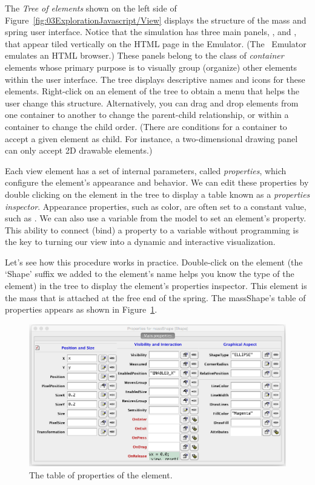 The \emph{Tree of elements} shown on the left side of Figure~\ref{fig:03ExplorationJavascript/View} displays the structure of the
mass and spring user interface. Notice that the simulation has three main panels, ,  and , that appear tiled vertically on the HTML page in the Emulator. (The \ejs\ Emulator emulates an HTML browser.) These panels belong to the class of \emph{container} elements whose primary
purpose is to visually group (organize) other elements within the user interface.
The tree displays descriptive names and icons for these elements.   Right-click on an element of the tree to
obtain a menu that helps the user change this structure. Alternatively, you can drag and drop elements from one container to another to change the parent-child relationship, or within a container to change the child order. (There are conditions for a container to accept a given element as child. For instance, a two-dimensional drawing panel can only accept 2D drawable elements.)

Each view element has a set of internal parameters, called \emph{properties}, which
configure the element's appearance and behavior. We can edit these properties by double clicking on the element in the
tree to display a table known as a \emph{properties inspector}.  Appearance properties, such as color, are often set to a constant value, such as . We can also use a variable from the model to set an element's property. This ability to connect (bind) a property to a variable without programming is the key to turning our view into a dynamic and interactive
visualization.

Let's see how this procedure works in practice. Double-click on the  element (the `Shape' suffix we added to the element's name helps you know the type of the element) in the tree to display
the element's properties inspector. This element is the mass that is attached at the free end of the spring. The massShape's table of properties appears as shown in Figure~\ref{fig:03ExplorationJavascript/SpringBallProperties}.
\begin{figure}[htb]
    \centering
  \includegraphics[scale=\scale]{03ExplorationJavascript/images/SpringBallProperties.png}
    \caption{The table of properties of the  element.}
    \label{fig:03ExplorationJavascript/SpringBallProperties}
\end{figure}


